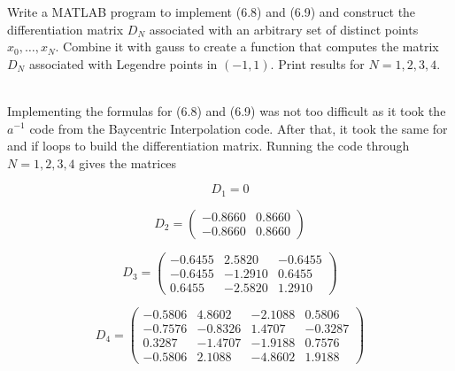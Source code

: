 Write a MATLAB program to implement (6.8) and (6.9) and construct the differentiation matrix $D_N$ 
associated with an arbitrary set of distinct points $x_0,\ldots , x_N$. Combine it with gauss to create 
a function that computes the matrix $D_N$ associated with Legendre points in $(-1,1)$. Print 
results for $N = 1,2,3,4$.\\

\begin{solution}\renewcommand{\qedsymbol}{}\ \\
    Implementing the formulas for (6.8) and (6.9) was not too difficult as it took the $a^{-1}$ code
    from the Baycentric Interpolation code. After that, it took the same for and if loops to build the
    differentiation matrix. Running the code through $N = 1, 2, 3, 4$ gives the matrices

    $$D_1 = 0$$

    $$D_2 = \left(\begin{array}{cc} -0.8660 & 0.8660 \\
                                    -0.8660 & 0.8660 \end{array}\right)$$

    $$D_3 = \left(\begin{array}{ccc} -0.6455 & 2.5820 & -0.6455 \\
                                     -0.6455 & -1.2910 & 0.6455 \\
                                     0.6455 & -2.5820 & 1.2910 \end{array}\right)$$

    $$D_4 = \left(\begin{array}{cccc} -0.5806 & 4.8602 & -2.1088 & 0.5806 \\
                                      -0.7576 & -0.8326 & 1.4707 & -0.3287 \\
                                      0.3287 & -1.4707 & -1.9188 & 0.7576 \\
                                      -0.5806 & 2.1088 & -4.8602 & 1.9188 \end{array}\right)$$

\end{solution}

\newpage

\newpage